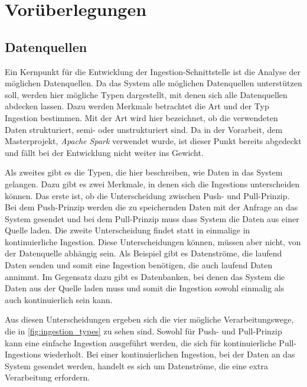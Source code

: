 \section{Vorüberlegungen}

\subsection{Datenquellen}
Ein Kernpunkt für die Entwicklung der Ingestion-Schnittstelle ist die Analyse der möglichen Datenquellen.
Da das System alle möglichen Datenquellen unterstützen soll, werden hier mögliche Typen dargestellt, mit denen sich alle Datenquellen abdecken lassen.
Dazu werden Merkmale betrachtet die Art und der Typ Ingestion bestimmen.
Mit der Art wird hier bezeichnet, ob die verwendeten Daten strukturiert, semi- oder unstrukturiert sind.
Da in der Vorarbeit, dem Masterprojekt, \textit{Apache Spark} verwendet wurde, ist dieser Punkt bereits abgedeckt und fällt bei der Entwicklung nicht weiter ins Gewicht.

Als zweites gibt es die Typen, die hier beschreiben, wie Daten in das System gelangen.
Dazu gibt es zwei Merkmale, in denen sich die Ingestions unterscheiden können.
Das erste ist, ob die Unterscheidung zwischen Push- und Pull-Prinzip.
Bei dem Push-Prinzip werden die zu speichernden Daten mit der Anfrage an das System gesendet und bei dem Pull-Prinzip muss dass System die Daten aus einer Quelle laden.
Die zweite Unterscheidung findet statt in einmalige in kontinuierliche Ingestion.
Diese Unterscheidungen können, müssen aber nicht, von der Datenquelle abhängig sein.
Als Beispiel gibt es Datenströme, die laufend Daten senden und somit eine Ingestion benötigen, die auch laufend Daten annimmt.
Im Gegensatz dazu gibt es Datenbanken, bei denen das System die Daten aus der Quelle laden muss und somit die Ingestion sowohl einmalig als auch kontinuierlich sein kann.

Aus diesen Unterscheidungen ergeben sich die vier mögliche Verarbeitungswege, die in \ref{fig:ingestion_types} zu sehen sind.
Sowohl für Push- und Pull-Prinzip kann eine einfache Ingestion ausgeführt werden, die sich für kontinuierliche Pull-Ingestions wiederholt.
Bei einer kontinuierlichen Ingestion, bei der Daten an das System gesendet werden, handelt es sich um Datenströme, die eine extra Verarbeitung erfordern.

